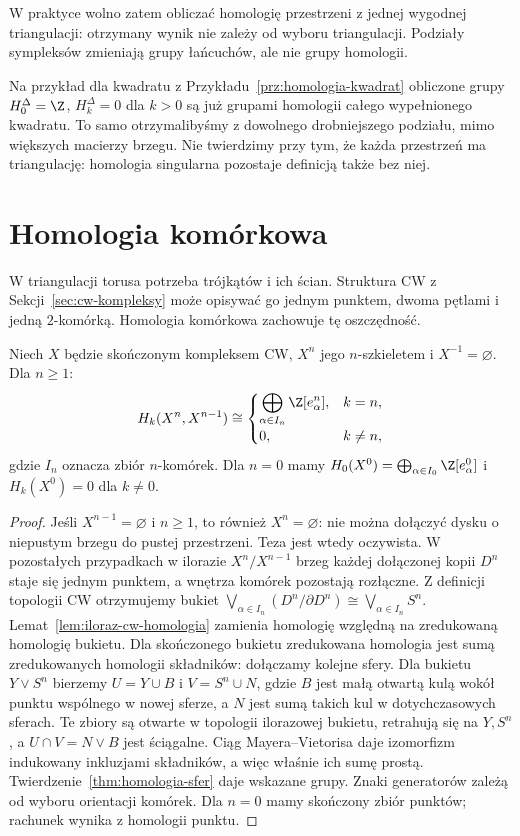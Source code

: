 W praktyce wolno zatem obliczać
homologię przestrzeni z jednej
wygodnej triangulacji: otrzymany
wynik nie zależy od wyboru
triangulacji. Podziały sympleksów
zmieniają grupy łańcuchów,
ale nie grupy homologii.

Na przykład dla kwadratu z
Przykładu~\ref{prz:homologia-kwadrat} obliczone grupy
$H_0^\Delta=\Z$, $H_k^\Delta=0$ dla $k>0$ są już grupami
homologii całego wypełnionego kwadratu. To samo otrzymalibyśmy
z dowolnego drobniejszego podziału, mimo większych macierzy brzegu.
Nie twierdzimy przy tym, że każda przestrzeń ma triangulację:
homologia singularna pozostaje definicją także bez niej.

\section{Homologia komórkowa}
\label{sec:homologia-komorkowa}

W triangulacji torusa potrzeba
trójkątów i ich ścian. Struktura
CW z Sekcji~\ref{sec:cw-kompleksy}
może opisywać go jednym punktem,
dwoma pętlami i jedną
$2$-komórką. Homologia komórkowa
zachowuje tę oszczędność.

\begin{twierdzenie}
\label{thm:warstwa-komorek}
Niech $X$ będzie skończonym
kompleksem CW, $X^n$ jego
$n$-szkieletem i $X^{-1}=\varnothing$.
Dla $n\geq1$:
\[
 H_k(X^n,X^{n-1})
 \cong
 \begin{cases}
 \displaystyle\bigoplus_{\alpha\in I_n}\Z[e_\alpha^n],
 &k=n,\\[3pt]0,&k\ne n,
 \end{cases}
\]
gdzie $I_n$ oznacza zbiór $n$-komórek.
Dla $n=0$ mamy
$H_0(X^0)=\bigoplus_{\alpha\in I_0}\Z[e_\alpha^0]$
i $H_k(X^0)=0$ dla $k\ne0$.
\end{twierdzenie}
\begin{proof}
Jeśli $X^{n-1}=\varnothing$ i $n\geq1$, to również $X^n=\varnothing$:
nie można dołączyć dysku o niepustym brzegu do pustej przestrzeni.
Teza jest wtedy oczywista. W pozostałych przypadkach
w ilorazie $X^n/X^{n-1}$
brzeg każdej dołączonej kopii
$D^n$ staje się jednym punktem,
a wnętrza komórek pozostają
rozłączne. Z definicji topologii
CW otrzymujemy bukiet
$\bigvee_{\alpha\in I_n}
(D^n/\partial D^n)\cong
\bigvee_{\alpha\in I_n}S^n$.
Lemat~\ref{lem:iloraz-cw-homologia}
zamienia homologię względną
na zredukowaną homologię bukietu.
Dla skończonego bukietu
zredukowana homologia jest sumą
zredukowanych homologii składników:
dołączamy kolejne sfery. Dla bukietu $Y\vee S^n$
bierzemy $U=Y\cup B$ i $V=S^n\cup N$, gdzie $B$ jest małą
otwartą kulą wokół punktu wspólnego w nowej sferze, a $N$
jest sumą takich kul w dotychczasowych sferach.
Te zbiory są otwarte w topologii ilorazowej bukietu,
retrahują się na $Y,S^n$, a $U\cap V=N\vee B$ jest ściągalne.
Ciąg Mayera--Vietorisa daje izomorfizm indukowany inkluzjami
składników, a więc właśnie ich sumę prostą.
Twierdzenie~\ref{thm:homologia-sfer}
daje wskazane grupy.
Znaki generatorów zależą
od wyboru orientacji komórek.
Dla $n=0$ mamy skończony
zbiór punktów; rachunek wynika
z homologii punktu.
\end{proof}

